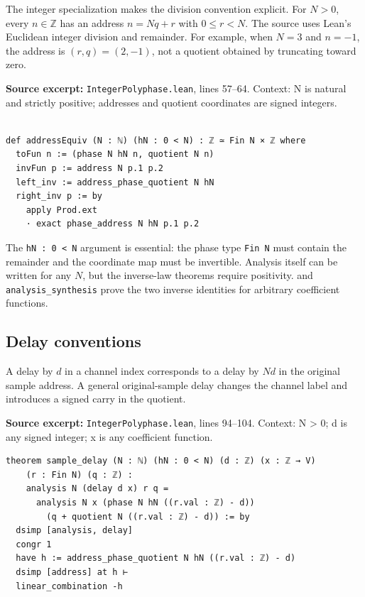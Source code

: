 \documentclass[11pt]{article}
\begin{document}
The integer specialization makes the division convention explicit. For \(N>0\), every \(n\in\mathbb Z\) has an address \(n=Nq+r\) with \(0\le r<N\). The source uses Lean's Euclidean integer division and remainder. For example, when \(N=3\) and \(n=-1\), the address is \((r,q)=(2,-1)\), not a quotient obtained by truncating toward zero.

\textbf{Source excerpt:} \texttt{IntegerPolyphase.lean}, lines 57--64. Context: N is natural and strictly positive; addresses and quotient coordinates are signed integers.

\begin{minipage}{\linewidth}
\begin{lstlisting}

def addressEquiv (N : ℕ) (hN : 0 < N) : ℤ ≃ Fin N × ℤ where
  toFun n := (phase N hN n, quotient N n)
  invFun p := address N p.1 p.2
  left_inv := address_phase_quotient N hN
  right_inv p := by
    apply Prod.ext
    · exact phase_address N hN p.1 p.2
\end{lstlisting}
\end{minipage}\par

The \texttt{hN : 0 < N} argument is essential: the phase type \texttt{Fin N} must contain the remainder and the coordinate map must be invertible. Analysis itself can be written for any \(N\), but the inverse-law theorems require positivity. \texttt{} and \texttt{analysis\_synthesis} prove the two inverse identities for arbitrary coefficient functions.

\hypertarget{delay-conventions}{%
\subsection{Delay conventions}\label{delay-conventions}}

A delay by \(d\) in a channel index corresponds to a delay by \(Nd\) in the original sample address. A general original-sample delay changes the channel label and introduces a signed carry in the quotient.

\textbf{Source excerpt:} \texttt{IntegerPolyphase.lean}, lines 94--104. Context: N \textgreater{} 0; d is any signed integer; x is any coefficient function.

\begin{minipage}{\linewidth}
\begin{lstlisting}
theorem sample_delay (N : ℕ) (hN : 0 < N) (d : ℤ) (x : ℤ → V)
    (r : Fin N) (q : ℤ) :
    analysis N (delay d x) r q =
      analysis N x (phase N hN ((r.val : ℤ) - d))
        (q + quotient N ((r.val : ℤ) - d)) := by
  dsimp [analysis, delay]
  congr 1
  have h := address_phase_quotient N hN ((r.val : ℤ) - d)
  dsimp [address] at h ⊢
  linear_combination -h
\end{lstlisting}
\end{minipage}\par
\end{document}
